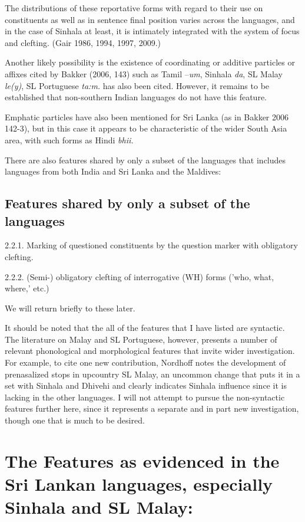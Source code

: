 \documentclass[letterpaper]{article}
\begin{document}
The distributions of these reportative forms with regard to their use on constituents as well as in sentence final position varies across the languages, and in the case of Sinhala at least, it is intimately integrated with the system of focus and clefting. (Gair 1986, 1994, 1997, 2009.)

Another likely possibility is the existence of coordinating or additive particles or affixes cited by Bakker (2006, 143) such as Tamil --\textit{um}, Sinhala \textit{da}, SL Malay \textit{le(y)},  SL Portuguese \textit{ta:m.} has also  been cited. However, it remains to be established that non-southern Indian languages do not have this feature.

Emphatic particles have also been mentioned for Sri Lanka (as in Bakker 2006 142-3), but in this case it appears to be characteristic of the wider South Asia area, with such forms as Hindi \textit{bhii.} 

There are also features shared by only a subset of the languages that includes languages from both India and Sri Lanka and the Maldives:

\subsection{Features shared by only a subset of the languages}

\begin{table}
 2.2.1. Marking of questioned constituents by the question marker with obligatory clefting.

 2.2.2. (Semi-) obligatory clefting of interrogative (WH) forms ('who, what, where,' etc.)
\end{table}

We will return briefly to these later.

It should be noted that the all of the features that I have listed are syntactic. The literature on Malay and SL Portuguese, however, presents a number of relevant phonological and morphological features that invite wider investigation. For example, to cite one new contribution, Nordhoff notes the development of prenasalized stops in upcountry SL Malay, an uncommon change that puts it in a set with Sinhala and Dhivehi and clearly indicates Sinhala influence since it is lacking in the other languages. I will not attempt to pursue the non-syntactic features further here, since it represents a separate and in part new investigation, though one that is much to be desired.

\section{The Features as evidenced in the Sri Lankan languages, especially Sinhala and SL Malay:}
\end{document}

